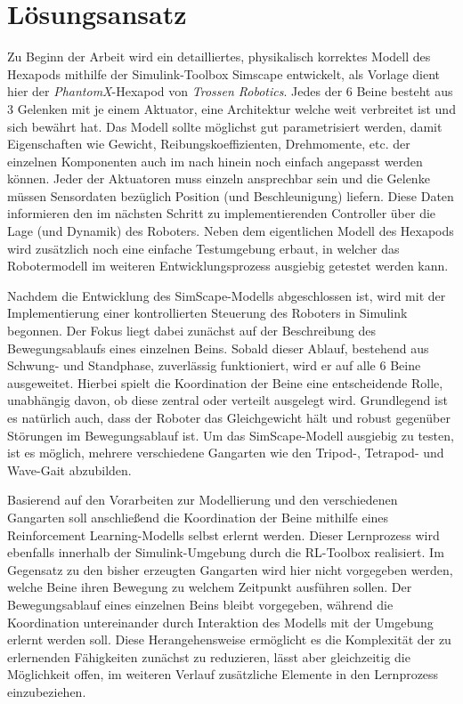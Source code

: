 \section{Lösungsansatz}
Zu Beginn der Arbeit wird ein detailliertes, physikalisch korrektes Modell des Hexapods mithilfe der Simulink-Toolbox Simscape entwickelt, als Vorlage dient hier der \emph{PhantomX}-Hexapod von \emph{Trossen Robotics}.
Jedes der 6 Beine besteht aus 3 Gelenken mit je einem Aktuator, eine Architektur welche weit verbreitet ist und sich bewährt hat.
Das Modell sollte möglichst gut parametrisiert werden, damit Eigenschaften wie Gewicht, Reibungskoeffizienten, Drehmomente, etc. der einzelnen Komponenten auch im nach hinein noch einfach angepasst werden können.
Jeder der Aktuatoren muss einzeln ansprechbar sein und die Gelenke müssen Sensordaten bezüglich Position (und Beschleunigung) liefern.
Diese Daten informieren den im nächsten Schritt zu implementierenden Controller über die Lage (und Dynamik) des Roboters.
Neben dem eigentlichen Modell des Hexapods wird zusätzlich noch eine einfache Testumgebung erbaut, in welcher das Robotermodell im weiteren Entwicklungsprozess ausgiebig getestet werden kann.

Nachdem die Entwicklung des SimScape-Modells abgeschlossen ist, wird mit der Implementierung einer kontrollierten Steuerung des Roboters in Simulink begonnen.
Der Fokus liegt dabei zunächst auf der Beschreibung des Bewegungsablaufs eines einzelnen Beins.
Sobald dieser Ablauf, bestehend aus Schwung- und Standphase, zuverlässig funktioniert, wird er auf alle 6 Beine ausgeweitet.
Hierbei spielt die Koordination der Beine eine entscheidende Rolle, unabhängig davon, ob diese zentral oder verteilt ausgelegt wird.
Grundlegend ist es natürlich auch, dass der Roboter das Gleichgewicht hält und robust gegenüber Störungen im Bewegungsablauf ist.
Um das SimScape-Modell ausgiebig zu testen, ist es möglich, mehrere verschiedene Gangarten wie den Tripod-, Tetrapod- und Wave-Gait abzubilden.

Basierend auf den Vorarbeiten zur Modellierung und den verschiedenen Gangarten soll anschließend die Koordination der Beine mithilfe eines Reinforcement Learning-Modells selbst erlernt werden.
Dieser Lernprozess wird ebenfalls innerhalb der Simulink-Umgebung durch die RL-Toolbox realisiert.
Im Gegensatz zu den bisher erzeugten Gangarten wird hier nicht vorgegeben werden, welche Beine ihren Bewegung zu welchem Zeitpunkt ausführen sollen.
Der Bewegungsablauf eines einzelnen Beins bleibt vorgegeben, während die Koordination untereinander durch Interaktion des Modells mit der Umgebung erlernt werden soll. 
Diese Herangehensweise ermöglicht es die Komplexität der zu erlernenden Fähigkeiten zunächst zu reduzieren, lässt aber gleichzeitig die Möglichkeit offen, im weiteren Verlauf zusätzliche Elemente in den Lernprozess einzubeziehen.


